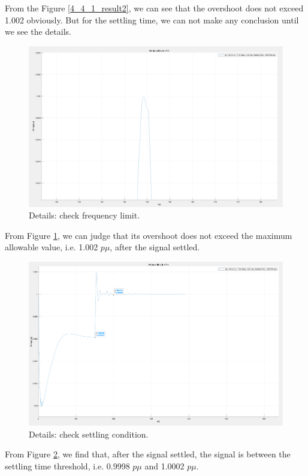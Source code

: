 \documentclass{report}
\begin{document}
From the Figure \textcolor{red}{\ref{4_4_1_result2}}, we can see that the overshoot does not exceed 1.002 obviously. But for the settling time, we can not make any conclusion until we see the details. \\


\begin{figure}[htbp]
\centering
\includegraphics[width = .819\textwidth]{figure/4_4_1_result3.png}
\caption{Details: check frequency limit.}
\label{4_4_1_result3}
\end{figure}

From Figure \textcolor{red}{\ref{4_4_1_result3}}, we can judge that its overshoot does not exceed the maximum allowable value, i.e. 1.002 $p\mu$, after the signal settled.\\

\begin{figure}[htbp]
\centering
\includegraphics[width = .819\textwidth]{figure/4_4_1_result4.png}
\caption{Details: check settling condition.}
\label{4_4_1_result4}
\end{figure}


From Figure \textcolor{red}{\ref{4_4_1_result4}}, we find that, after the signal settled, the signal is between the settling time threshold, i.e. 0.9998 $p\mu$ and 1.0002 $p\mu$.\\
\end{document}
